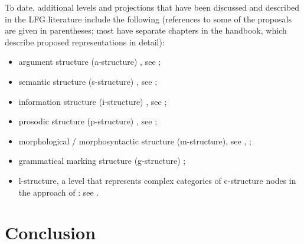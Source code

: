 \documentclass[output=paper]{langscibook}
\begin{document}
 To date, additional levels and projections that have been discussed
 and described in the LFG literature include the following (references to some of the proposals are given in parentheses; most have separate chapters in the handbook, which describe proposed representations in detail):
 
 \begin{itemize}
  \item argument structure (a-structure) \parencite{butt1997architecture}, see ;
  \item semantic structure (s-structure) \parencite{Dalrymple:Glue}, see ;
  \item information structure (i-structure) \parencite{King1997,BK00,DN}, see ;
  \item prosodic structure (p-structure) \parencite{DM11,boegel2012}, see ;
  \item morphological / morphosyntactic structure (m-structure), see \parencite{butt-etal2004,sadler-nordlinger2004}, ;
  \item grammatical marking structure (g-structure) \parencite{falk06};
  \item l-structure, a level that represents complex categories of c-structure nodes in the approach of \citet{low:lov:20}: see . 
 \end{itemize}

 \section{Conclusion}
 
\end{document}
